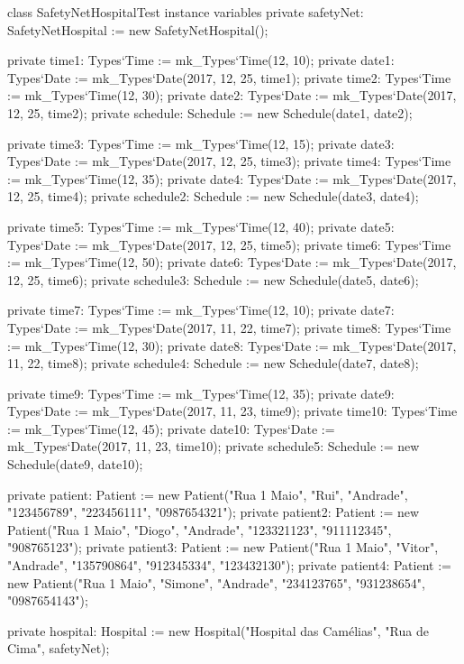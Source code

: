 \begin{vdmpp}[breaklines=true]
class SafetyNetHospitalTest
instance variables
 private safetyNet: SafetyNetHospital := new SafetyNetHospital();
 
 private time1: Types`Time := mk_Types`Time(12, 10);
 private date1: Types`Date := mk_Types`Date(2017, 12, 25, time1);
 private time2: Types`Time := mk_Types`Time(12, 30);
 private date2: Types`Date := mk_Types`Date(2017, 12, 25, time2);
 private schedule: Schedule := new Schedule(date1, date2);
 
 private time3: Types`Time := mk_Types`Time(12, 15);
 private date3: Types`Date := mk_Types`Date(2017, 12, 25, time3);
 private time4: Types`Time := mk_Types`Time(12, 35);
 private date4: Types`Date := mk_Types`Date(2017, 12, 25, time4);
 private schedule2: Schedule := new Schedule(date3, date4);
 
 private time5: Types`Time := mk_Types`Time(12, 40);
 private date5: Types`Date := mk_Types`Date(2017, 12, 25, time5);
 private time6: Types`Time := mk_Types`Time(12, 50);
 private date6: Types`Date := mk_Types`Date(2017, 12, 25, time6);
 private schedule3: Schedule := new Schedule(date5, date6);
 
 private time7: Types`Time := mk_Types`Time(12, 10);
 private date7: Types`Date := mk_Types`Date(2017, 11, 22, time7);
 private time8: Types`Time := mk_Types`Time(12, 30);
 private date8: Types`Date := mk_Types`Date(2017, 11, 22, time8);
 private schedule4: Schedule := new Schedule(date7, date8);
 
 private time9: Types`Time := mk_Types`Time(12, 35);
 private date9: Types`Date := mk_Types`Date(2017, 11, 23, time9);
 private time10: Types`Time := mk_Types`Time(12, 45);
 private date10: Types`Date := mk_Types`Date(2017, 11, 23, time10);
 private schedule5: Schedule := new Schedule(date9, date10);
 
 private patient: Patient := new Patient("Rua 1 Maio", "Rui", "Andrade", "123456789", "223456111", "0987654321");
 private patient2: Patient := new Patient("Rua 1 Maio", "Diogo", "Andrade", "123321123", "911112345", "908765123");
 private patient3: Patient := new Patient("Rua 1 Maio", "Vitor", "Andrade", "135790864", "912345334", "123432130");
 private patient4: Patient := new Patient("Rua 1 Maio", "Simone", "Andrade", "234123765", "931238654", "0987654143");
 
  private hospital: Hospital := new Hospital("Hospital das Camélias", "Rua de Cima", safetyNet);
  

\end{vdmpp}

